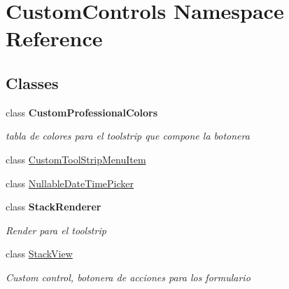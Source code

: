\hypertarget{namespace_custom_controls}{}\section{Custom\+Controls Namespace Reference}
\label{namespace_custom_controls}
\subsection*{Classes}
\begin{DoxyCompactItemize}
\item 
class {\bfseries Custom\+Professional\+Colors}
\begin{DoxyCompactList}\small\item\em tabla de colores para el toolstrip que compone la botonera \end{DoxyCompactList}\item 
class \mbox{\hyperlink{class_custom_controls_1_1_custom_tool_strip_menu_item}{Custom\+Tool\+Strip\+Menu\+Item}}
\item 
class \mbox{\hyperlink{class_custom_controls_1_1_nullable_date_time_picker}{Nullable\+Date\+Time\+Picker}}
\item 
class {\bfseries Stack\+Renderer}
\begin{DoxyCompactList}\small\item\em Render para el toolstrip \end{DoxyCompactList}\item 
class \mbox{\hyperlink{class_custom_controls_1_1_stack_view}{Stack\+View}}
\begin{DoxyCompactList}\small\item\em Custom control, botonera de acciones para los formulario \end{DoxyCompactList}\end{DoxyCompactItemize}
